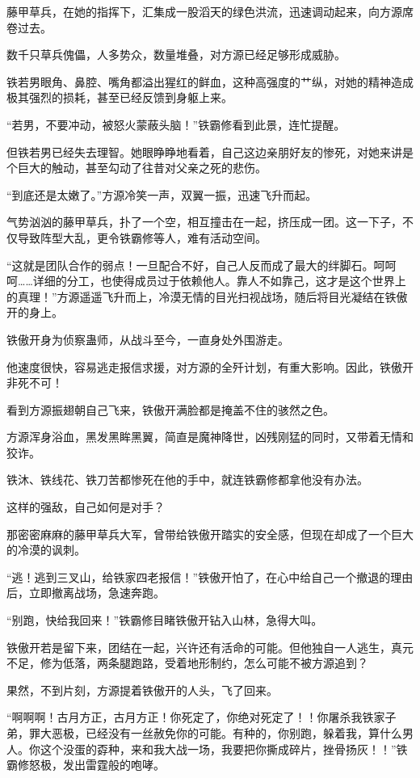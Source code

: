 \begin{this_body}
藤甲草兵，在她的指挥下，汇集成一股滔天的绿色洪流，迅速调动起来，向方源席卷过去。

数千只草兵傀儡，人多势众，数量堆叠，对方源已经足够形成威胁。

铁若男眼角、鼻腔、嘴角都溢出猩红的鲜血，这种高强度的艹纵，对她的精神造成极其强烈的损耗，甚至已经反馈到身躯上来。

“若男，不要冲动，被怒火蒙蔽头脑！”铁霸修看到此景，连忙提醒。

但铁若男已经失去理智。她眼睁睁地看着，自己这边亲朋好友的惨死，对她来讲是个巨大的触动，甚至勾动了往昔对父亲之死的悲伤。

“到底还是太嫩了。”方源冷笑一声，双翼一振，迅速飞升而起。

气势汹汹的藤甲草兵，扑了一个空，相互撞击在一起，挤压成一团。这一下子，不仅导致阵型大乱，更令铁霸修等人，难有活动空间。

“这就是团队合作的弱点！一旦配合不好，自己人反而成了最大的绊脚石。呵呵呵……详细的分工，也使得成员过于依赖他人。靠人不如靠己，这才是这个世界上的真理！”方源遥遥飞升而上，冷漠无情的目光扫视战场，随后将目光凝结在铁傲开的身上。

铁傲开身为侦察蛊师，从战斗至今，一直身处外围游走。

他速度很快，容易逃走报信求援，对方源的全歼计划，有重大影响。因此，铁傲开非死不可！

看到方源振翅朝自己飞来，铁傲开满脸都是掩盖不住的骇然之色。

方源浑身浴血，黑发黑眸黑翼，简直是魔神降世，凶残刚猛的同时，又带着无情和狡诈。

铁沐、铁线花、铁刀苦都惨死在他的手中，就连铁霸修都拿他没有办法。

这样的强敌，自己如何是对手？

那密密麻麻的藤甲草兵大军，曾带给铁傲开踏实的安全感，但现在却成了一个巨大的冷漠的讽刺。

“逃！逃到三叉山，给铁家四老报信！”铁傲开怕了，在心中给自己一个撤退的理由后，立即撤离战场，急速奔跑。

“别跑，快给我回来！”铁霸修目睹铁傲开钻入山林，急得大叫。

铁傲开若是留下来，团结在一起，兴许还有活命的可能。但他独自一人逃生，真元不足，修为低落，两条腿跑路，受着地形制约，怎么可能不被方源追到？

果然，不到片刻，方源提着铁傲开的人头，飞了回来。

“啊啊啊！古月方正，古月方正！你死定了，你绝对死定了！！你屠杀我铁家子弟，罪大恶极，已经没有一丝赦免你的可能。有种的，你别跑，躲着我，算什么男人。你这个没蛋的孬种，来和我大战一场，我要把你撕成碎片，挫骨扬灰！！”铁霸修怒极，发出雷霆般的咆哮。


\end{this_body}
